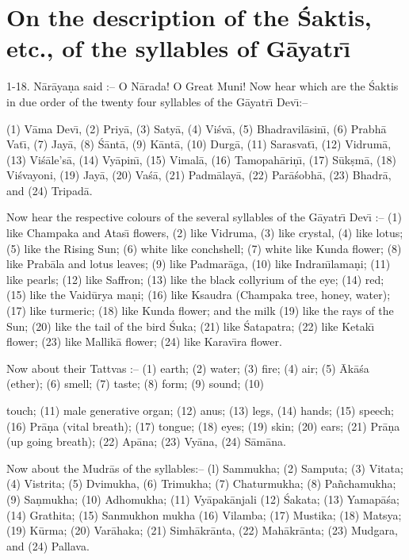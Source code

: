 \chapter{On the description of the \'Saktis, etc., of the syllables of G\=ayatr\={\i}}

1-18. N\=ar\=aya\d{n}a said :-- O N\=arada! O Great Muni! Now hear which are the \'Saktis in due order of the twenty four syllables of the G\=ayatr\={\i} Dev\={\i}:--

(1) V\=ama Dev\={\i}, (2) Priy\=a, (3) Saty\=a, (4) Vi\'sv\=a, (5) Bhadravil\=asin\={\i}, (6) Prabh\=a Vat\={\i}, (7) Jay\=a, (8) \'S\=ant\=a, (9) K\=ant\=a, (10) Durg\=a, (11) Sarasvat\={\i}, (12) Vidrum\=a, (13) Vi\'s\=ale's\=a, (14) Vy\=apin\={\i}, (15) Vimal\=a, (16) Tamopah\=ari\d{n}\={\i}, (17) S\=uk\d{s}m\=a, (18) Vi\'svayoni, (19) Jay\=a, (20) Va\'s\=a, (21) Padm\=alay\=a, (22) Par\=a\'sobh\=a, (23) Bhadr\=a, and (24) Tripad\=a.

Now hear the respective colours of the several syllables of the G\=ayatr\={\i} Dev\={\i} :-- (1) like Champaka and Atas\={\i} flowers, (2) like Vidruma, (3) like crystal, (4) like lotus; (5) like the Rising Sun; (6) white like conchshell; (7) white like Kunda flower; (8) like Prab\=ala and lotus leaves; (9) like Padmar\=aga, (10) like Indran\={\i}lama\d{n}i; (11) like pearls; (12) like Saffron; (13) like the black collyrium of the eye; (14) red; (15) like the Vaid\=urya ma\d{n}i; (16) like Ksaudra (Champaka tree, honey, water); (17) like turmeric; (18) like Kunda flower; and the milk (19) like the rays of the Sun; (20) like the tail of the bird \'Suka; (21) like \'Satapatra; (22) like Ketak\={\i} flower; (23) like Mallik\=a flower; (24) like Karav\={\i}ra flower.

Now about their Tattvas :-- (1) earth; (2) water; (3) fire; (4) air; (5) \=Ak\=a\'sa (ether); (6) smell; (7) taste; (8) form; (9) sound; (10)

touch; (11) male generative organ; (12) anus; (13) legs, (14) hands; (15) speech; (16) Pr\=a\d{n}a (vital breath); (17) tongue; (18) eyes; (19) skin; (20) ears; (21) Pr\=a\d{n}a (up going breath); (22) Ap\=ana; (23) Vy\=ana, (24) S\=am\=ana.

Now about the Mudr\=as of the syllables:-- (l) Sammukha; (2) Samputa; (3) Vitata; (4) Vistrita; (5) Dvimukha, (6) Trimukha; (7) Chaturmukha; (8) Pa\~nchamukha; (9) Sa\d{n}mukha; (10) Adhomukha; (11) Vy\=apak\=anjali (12) \'Sakata; (13) Yamap\=a\'sa; (14) Grathita; (15) Sanmukhon mukha (16) Vilamba; (17) Mustika; (18) Matsya; (19) K\=urma; (20) Var\=ahaka; (21) Simh\=akr\=anta, (22) Mah\=akr\=anta; (23) Mudgara, and (24) Pallava.

